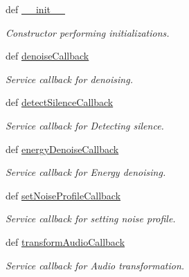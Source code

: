 \begin{DoxyCompactItemize}
\item 
def \hyperlink{classrapp__audio__processing_1_1rapp__audio__processing_1_1AudioProcessing_afd5d86bf6f70bccc62ccf91e04cb5cca}{\-\_\-\-\_\-init\-\_\-\-\_\-}
\begin{DoxyCompactList}\small\item\em Constructor performing initializations. \end{DoxyCompactList}\item 
def \hyperlink{classrapp__audio__processing_1_1rapp__audio__processing_1_1AudioProcessing_a5280d1ae58e00e61b58959b5c51547ef}{denoise\-Callback}
\begin{DoxyCompactList}\small\item\em Service callback for denoising. \end{DoxyCompactList}\item 
def \hyperlink{classrapp__audio__processing_1_1rapp__audio__processing_1_1AudioProcessing_aed5f4c5ae8875a1959af81ede78a9dc4}{detect\-Silence\-Callback}
\begin{DoxyCompactList}\small\item\em Service callback for Detecting silence. \end{DoxyCompactList}\item 
def \hyperlink{classrapp__audio__processing_1_1rapp__audio__processing_1_1AudioProcessing_ae204bf3275f20bd554c3a1030ab8312c}{energy\-Denoise\-Callback}
\begin{DoxyCompactList}\small\item\em Service callback for Energy denoising. \end{DoxyCompactList}\item 
def \hyperlink{classrapp__audio__processing_1_1rapp__audio__processing_1_1AudioProcessing_abae3b74a23c3bb6c7d41b31276dfc3cc}{set\-Noise\-Profile\-Callback}
\begin{DoxyCompactList}\small\item\em Service callback for setting noise profile. \end{DoxyCompactList}\item 
def \hyperlink{classrapp__audio__processing_1_1rapp__audio__processing_1_1AudioProcessing_ab4b651662da6e310fb80605db2c52d7f}{transform\-Audio\-Callback}
\begin{DoxyCompactList}\small\item\em Service callback for Audio transformation. \end{DoxyCompactList}\end{DoxyCompactItemize}
